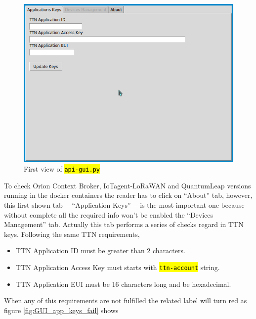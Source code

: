 \documentclass[11pt,a4paper,dvipsnames,twoside]{article}
\newcommand{\cmd}[1] {\hl{\texttt{#1}}}
\begin{document}
\begin{figure}[ht]
  \centering
  \includegraphics[width=.9\textwidth]{../pictures/GUI_app_keys.png}
  \caption{First view of \cmd{api-gui.py}}
  \label{fig:GUI_app_keys}
\end{figure}

To check Orion Context Broker, IoTagent-LoRaWAN and QuantumLeap versions running in the docker containers the reader has to click on \enquote{About} tab, however, this first shown tab ---\enquote{Application Keys}--- is the most important one because without complete all the required info won't be enabled the \enquote{Devices Management} tab. Actually this tab performs a series of checks regard in TTN keys. Following the same TTN requirements, 

\begin{itemize}
  \item TTN Application ID must be greater than 2 characters.
  \item TTN Application Access Key must starts with \cmd{ttn-account} string.
  \item TTN Application EUI must be 16 characters long and be hexadecimal. 
\end{itemize}
When any of this requirements are not fulfilled the related label will turn red as figure \ref{fig:GUI_app_keys_fail} shows
\end{document}
